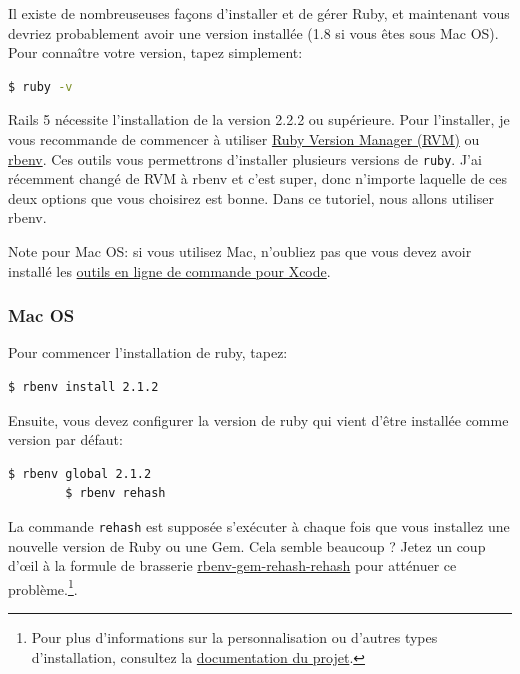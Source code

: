 \documentclass[]{report}
\begin{document}
      Il existe de nombreuseuses façons d'installer et de gérer Ruby, et maintenant vous devriez probablement avoir une version installée (1.8 si vous êtes sous Mac OS). Pour connaître votre version, tapez simplement:

      \begin{scriptsize}
      \begin{lstlisting}[language=bash]
      $ ruby -v
      \end{lstlisting}
      \end{scriptsize}

      Rails 5 nécessite l'installation de la version 2.2.2 ou supérieure. Pour l'installer, je vous recommande de commencer à utiliser \href{http://rvm.io/}{Ruby Version Manager (RVM)} ou \href{http://rbenv.org/}{rbenv}. Ces outils vous permettrons d'installer plusieurs versions de \verb|ruby|. J'ai récemment changé de RVM à rbenv et c'est super, donc n'importe laquelle de ces deux options que vous choisirez est bonne. Dans ce tutoriel, nous allons utiliser rbenv.

      Note pour Mac OS: si vous utilisez Mac, n'oubliez pas que vous devez avoir installé les \href{https://developer.apple.com/downloads/}{outils en ligne de commande pour Xcode}.


      \subsubsection{Mac OS}

        Pour commencer l'installation de ruby, tapez:

        \begin{scriptsize}
        \begin{lstlisting}[language=bash]
        $ rbenv install 2.1.2
        \end{lstlisting}
        \end{scriptsize}

        Ensuite, vous devez configurer la version de ruby qui vient d'être installée comme version par défaut:

        \begin{scriptsize}
        \begin{lstlisting}[language=bash]
        $ rbenv global 2.1.2
        $ rbenv rehash
        \end{lstlisting}
        \end{scriptsize}

        La commande \verb|rehash| est supposée s'exécuter à chaque fois que vous installez une nouvelle version de Ruby ou une Gem. Cela semble beaucoup ? Jetez un coup d'œil à la formule de brasserie \href{https://github.com/sstephenson/rbenv-gem-rehash}{rbenv-gem-rehash-rehash} pour atténuer ce problème.\footnote{Pour plus d'informations sur la personnalisation ou d'autres types d'installation, consultez la \href{https://github.com/sstephenson/rbenv}{documentation du projet}.}.
\end{document}
